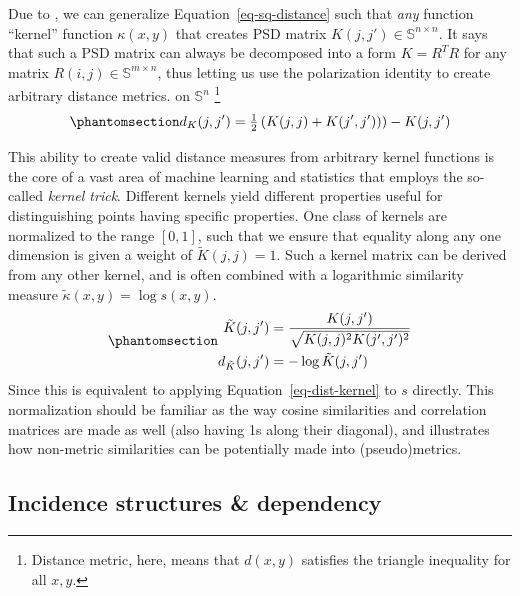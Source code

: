 \documentclass[%
	12pt,
		oneside,
		letterpaper
]{book}
\begin{document}
Due to \autocite{Metricspacespositive_Schoenberg1938}, we can generalize
Equation~\ref{eq-sq-distance} such that \emph{any} function ``kernel''
function \(\kappa(x,y)\) that creates PSD matrix
\(K(j,j')\in\mathbb{S}^{n\times n}\). It says that such a PSD matrix can
always be decomposed into a form \(K=R^TR\) for any matrix
\(R(i,j)\in \mathbb{S}^{m\times n}\), thus letting us use the
polarization identity to create arbitrary distance metrics. on
\(\mathbb{S}^n\)
\autocite{SimilaritiesgraphsKernels_Avrachenkov2019}\footnote{ Distance
  metric, here, means that \(d(x,y)\) satisfies the triangle inequality
  for all \(x,y\).}
\begin{equation}\phantomsection\label{eq-dist-kernel}{
d_K(j,j') = \tfrac{1}{2}\left(K(j,j)+K(j',j'))\right)-K(j,j')
}\end{equation}

This ability to create valid distance measures from arbitrary kernel
functions is the core of a vast area of machine learning and statistics
that employs the so-called \emph{kernel trick}.
\autocite{Patternrecognition_Theodoridis2010} Different kernels yield
different properties useful for distinguishing points having specific
properties. One class of kernels are normalized to the range \([0,1]\),
such that we ensure that equality along any one dimension is given a
weight of \(\tilde{K}(j,j)=1\). Such a kernel matrix can be derived from
any other kernel, and is often combined with a logarithmic similarity
measure \(\tilde{\kappa}(x,y)=\log{s(x,y)}\).
\begin{equation}\phantomsection\label{eq-norm-diag}{
\begin{aligned}
\tilde{K}(j,j') &= \frac{K(j,j')}{\sqrt{K(j,j)^2K(j',j')^2}}\\
d_{\tilde{K}}(j,j') &= -\log{\tilde{K}(j,j')}
\end{aligned}
}\end{equation} Since this is equivalent to applying
Equation~\ref{eq-dist-kernel} to \(s\) directly. This normalization
should be familiar as the way cosine similarities and correlation
matrices are made as well (also having 1s along their diagonal), and
illustrates how non-metric similarities can be potentially made into
(pseudo)metrics.

\subsection{Incidence structures \&
dependency}\label{incidence-structures-dependency}
\end{document}
